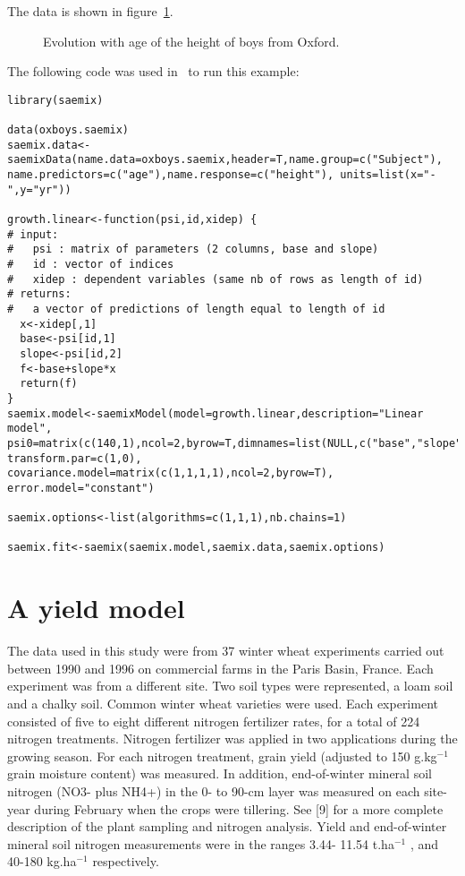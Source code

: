 {The data is shown in figure~\ref{fig:oxboysdata}.

\begin{figure}[!h]
\begin{center}
\par \kern -1cm
\end{center}
\par \kern -0.5cm
\caption{Evolution with age of the height of boys from Oxford.} \label{fig:oxboysdata}
\end{figure}

The following code was used in \R~to run this example:
\begin{verbatim}
library(saemix)

data(oxboys.saemix)
saemix.data<-saemixData(name.data=oxboys.saemix,header=T,name.group=c("Subject"), 
name.predictors=c("age"),name.response=c("height"), units=list(x="-",y="yr"))

growth.linear<-function(psi,id,xidep) {
# input:
#   psi : matrix of parameters (2 columns, base and slope)
#   id : vector of indices 
#   xidep : dependent variables (same nb of rows as length of id)
# returns:
#   a vector of predictions of length equal to length of id
  x<-xidep[,1]
  base<-psi[id,1]
  slope<-psi[id,2]
  f<-base+slope*x
  return(f)
}
saemix.model<-saemixModel(model=growth.linear,description="Linear model", 
psi0=matrix(c(140,1),ncol=2,byrow=T,dimnames=list(NULL,c("base","slope"))),  
transform.par=c(1,0), covariance.model=matrix(c(1,1,1,1),ncol=2,byrow=T), 
error.model="constant")

saemix.options<-list(algorithms=c(1,1,1),nb.chains=1)

saemix.fit<-saemix(saemix.model,saemix.data,saemix.options)
\end{verbatim}


\par \kern -0.5cm
\section{A yield model} \label{sec:exampleyield}

The data used in this study were from 37 winter wheat experiments carried out between 1990 and 1996 on commercial farms in the Paris Basin, France. Each experiment was from a different site. Two soil types were represented, a loam soil and a chalky soil. Common winter wheat varieties were used. Each experiment consisted of five to eight different nitrogen fertilizer rates, for a total of 224 nitrogen treatments. Nitrogen fertilizer was applied in two applications during the growing season. For each nitrogen treatment, grain yield (adjusted to 150 g.kg$^{-1}$ grain moisture content) was measured. In addition, end-of-winter mineral soil nitrogen (NO3- plus NH4+) in the 0- to 90-cm layer was measured on each site-year during February when the crops were tillering. See [9] for a more complete description of the plant sampling and nitrogen analysis. Yield and end-of-winter mineral soil nitrogen measurements were in the ranges 3.44- 11.54 t.ha$^{-1}$ , and 40-180 kg.ha$^{-1}$ respectively.

}
